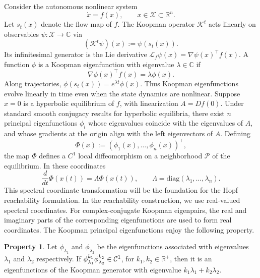 \documentclass[letterpaper, 10 pt, conference]{ieeeconf}
\newcommand{\mR}{{\mathbb R}}
\theoremstyle{plain}
\theoremstyle{definition}
\newtheorem{property}{Property}
\begin{document}
Consider the autonomous nonlinear system
\begin{equation}
    \dot x = f(x), \qquad x\in\mathcal{X}\subset\mathbb{R}^n.
\end{equation}
Let $s_t(x)$ denote the flow map of $f$. 
The Koopman operator $\mathcal{K}^t$ acts linearly on observables 
$\psi:\mathcal{X}\to\mathbb{C}$ via
\[
(\mathcal{K}^t \psi)(x) := \psi(s_t(x)).
\]
Its infinitesimal generator is the Lie derivative
$\mathcal{L}_f \psi(x) = \nabla \psi(x)^\top f(x)$.
A function $\phi$ is a Koopman eigenfunction with eigenvalue $\lambda\in\mathbb{C}$ if
\begin{equation}
    \nabla \phi(x)^\top f(x) = \lambda \phi(x).
\end{equation}
Along trajectories, $
\phi(s_t(x)) = e^{\lambda t}\phi(x)$.
Thus Koopman eigenfunctions evolve linearly in time even when the state dynamics are nonlinear.
Suppose $x=0$ is a hyperbolic equilibrium of $f$, with linearization $A = Df(0)$. 
Under standard smooth conjugacy results for hyperbolic equilibria, there exist $n$ principal eigenfunctions $\phi_i$ whose eigenvalues coincide with the eigenvalues of $A$, and whose gradients at the origin align with the left eigenvectors of $A$. Defining
\[
\Phi(x) := (\phi_1(x),\dots,\phi_n(x))^\top,
\]
the map $\Phi$ defines a $C^1$ local diffeomorphism on a neighborhood $\mathcal{P}$ of the equilibrium.
In these coordinates 
\[
\frac{d}{dt}\Phi(x(t)) = \Lambda \Phi(x(t)),
\qquad
\Lambda = \mathrm{diag}(\lambda_1,\dots,\lambda_n).
\]
This spectral coordinate transformation will be the foundation for the Hopf reachability formulation.
In the reachability construction, we use real-valued spectral coordinates. For complex-conjugate Koopman eigenpairs, the real and imaginary parts of the corresponding eigenfunctions are used to form real coordinates.
The Koopman principal eigenfunctions enjoy the following property.

\begin{property}\label{property1}
    Let $\phi_{\lambda_1}$ and $\phi_{\lambda_2}$ be the eigenfunctions associated with eigenvalues $\lambda_1$ and $\lambda_2$ respectively. If $\phi_{\lambda_1}^{k_1}\phi_{\lambda_2}^{k_2}\in {\cal C}^1$, for $k_1,k_2\in \mR^{+}$, then it is an eigenfunctions of the Koopman generator with eigenvalue $k_1\lambda_1+k_2\lambda_2$. 
\end{property}
\end{document}
